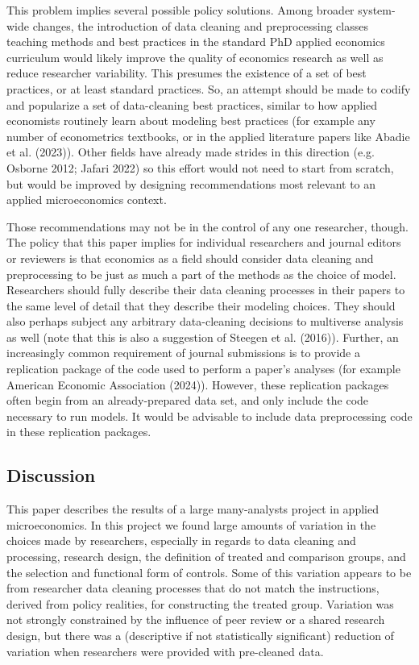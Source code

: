 \documentclass[
  letterpaper,
  DIV=11,
  numbers=noendperiod]{scrartcl}
\begin{document}
This problem implies several possible policy solutions. Among broader
system-wide changes, the introduction of data cleaning and preprocessing
classes teaching methods and best practices in the standard PhD applied
economics curriculum would likely improve the quality of economics
research as well as reduce researcher variability. This presumes the
existence of a set of best practices, or at least standard practices.
So, an attempt should be made to codify and popularize a set of
data-cleaning best practices, similar to how applied economists
routinely learn about modeling best practices (for example any number of
econometrics textbooks, or in the applied literature papers like Abadie
et al. (2023)). Other fields have already made strides in this direction
(e.g. Osborne 2012; Jafari 2022) so this effort would not need to start
from scratch, but would be improved by designing recommendations most
relevant to an applied microeconomics context.

Those recommendations may not be in the control of any one researcher,
though. The policy that this paper implies for individual researchers
and journal editors or reviewers is that economics as a field should
consider data cleaning and preprocessing to be just as much a part of
the methods as the choice of model. Researchers should fully describe
their data cleaning processes in their papers to the same level of
detail that they describe their modeling choices. They should also
perhaps subject any arbitrary data-cleaning decisions to multiverse
analysis as well (note that this is also a suggestion of Steegen et al.
(2016)). Further, an increasingly common requirement of journal
submissions is to provide a replication package of the code used to
perform a paper's analyses (for example American Economic Association
(2024)). However, these replication packages often begin from an
already-prepared data set, and only include the code necessary to run
models. It would be advisable to include data preprocessing code in
these replication packages.

\hypertarget{discussion}{%
\subsection{Discussion}\label{discussion}}

This paper describes the results of a large many-analysts project in
applied microeconomics. In this project we found large amounts of
variation in the choices made by researchers, especially in regards to
data cleaning and processing, research design, the definition of treated
and comparison groups, and the selection and functional form of
controls. Some of this variation appears to be from researcher data
cleaning processes that do not match the instructions, derived from
policy realities, for constructing the treated group. Variation was not
strongly constrained by the influence of peer review or a shared
research design, but there was a (descriptive if not statistically
significant) reduction of variation when researchers were provided with
pre-cleaned data.
\end{document}
